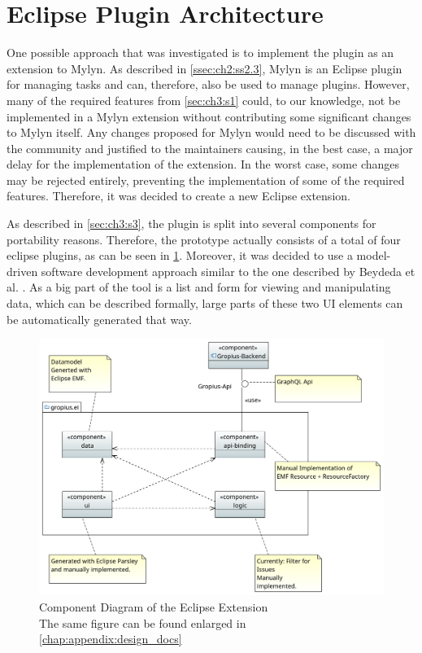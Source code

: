 \section{Eclipse Plugin Architecture}
\label{sec:ch4:s3}
One possible approach that was investigated is to implement the plugin as an extension to Mylyn.
As described in \cref{ssec:ch2:ss2.3}, Mylyn is an \gls{Eclipse} plugin for managing tasks and can, therefore, also be used to manage plugins.
However, many of the required features from \cref{sec:ch3:s1} could, to our knowledge, not be implemented in a Mylyn extension without contributing some significant changes to Mylyn itself.
Any changes proposed for Mylyn would need to be discussed with the community and justified to the maintainers causing, in the best case, a major delay for the implementation of the extension.
In the worst case, some changes may be rejected entirely, preventing the implementation of some of the required features.
Therefore, it was decided to create a new \gls{Eclipse} extension.

As described in \cref{sec:ch3:s3}, the plugin is split into several components for portability reasons.
Therefore, the prototype actually consists of a total of four eclipse plugins, as can be seen in \cref{fig:c4:component_diagram}.
Moreover, it was decided to use a model-driven software development approach similar to the one described by Beydeda et al. \cite{beydeda2005model}.
As a big part of the tool is a list and form for viewing and manipulating data, which can be described formally,
large parts of these two \gls{UI} elements can be automatically generated that way.

\begin{figure}[!h]
	\centering
	\includegraphics[width=\textwidth]{graphics/Component_Diagram.png}
	\caption{Component Diagram of the Eclipse Extension \\ \footnotesize{The same figure can be found enlarged in \cref{chap:appendix:design_docs}}}
	\label{fig:c4:component_diagram}
\end{figure}

